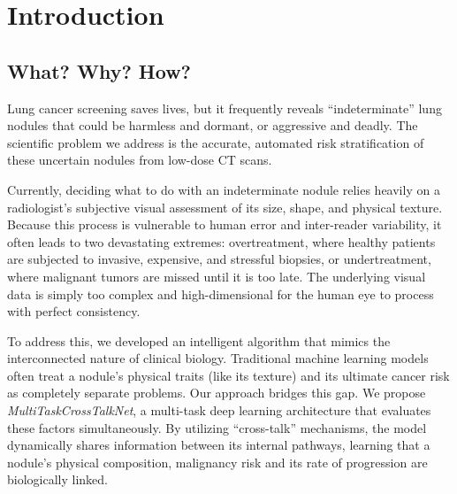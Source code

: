 \chapter{Introduction}
\label{chapter:introduction}

\section{What? Why? How?}
\label{section:what}



Lung cancer screening saves lives, but it frequently reveals ``indeterminate'' lung nodules that could be harmless and dormant, or aggressive and deadly. The scientific problem we address is the accurate, automated risk stratification of these uncertain nodules from low-dose CT scans.

Currently, deciding what to do with an indeterminate nodule relies heavily on a radiologist's subjective visual assessment of its size, shape, and physical texture. Because this process is vulnerable to human error and inter-reader variability, it often leads to two devastating extremes: overtreatment, where healthy patients are subjected to invasive, expensive, and stressful biopsies, or undertreatment, where malignant tumors are missed until it is too late. The underlying visual data is simply too complex and high-dimensional for the human eye to process with perfect consistency.

To address this, we developed an intelligent algorithm that mimics the interconnected nature of clinical biology. Traditional machine learning models often treat a nodule's physical traits (like its texture) and its ultimate cancer risk as completely separate problems. Our approach bridges this gap. We propose \textit{MultiTaskCrossTalkNet}, a multi-task deep learning architecture that evaluates these factors simultaneously. By utilizing ``cross-talk'' mechanisms, the model dynamically shares information between its internal pathways, learning that a nodule's physical composition, malignancy risk and its rate of progression are biologically linked.


